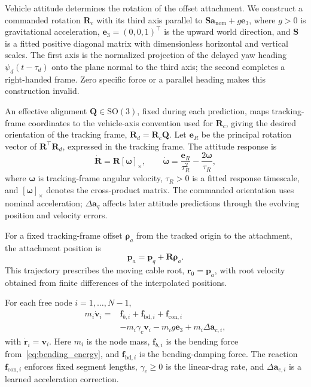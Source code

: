 Vehicle attitude determines the rotation of the offset attachment.
We construct a commanded rotation $\mathbf R_c$ with its third
axis parallel to
$\mathbf S\mathbf a_{\mathrm{nom}}+g\mathbf e_3$,
where $g>0$ is gravitational acceleration,
$\mathbf e_3=(0,0,1)^\top$ is the upward world direction,
and $\mathbf S$ is a fitted positive diagonal matrix with
dimensionless horizontal and vertical scales.
The first axis is the normalized projection of the delayed yaw
heading $\psi_d(t-\tau_d)$ onto the plane normal to the third
axis; the second completes a right-handed frame. Zero specific
force or a parallel heading makes this construction invalid.

An effective alignment $\mathbf Q\in\mathrm{SO}(3)$, fixed
during each prediction, maps tracking-frame coordinates to the
vehicle-axis convention used for $\mathbf R_c$, giving the
desired orientation of the tracking frame,
$\mathbf R_d=\mathbf R_c\mathbf Q$.
Let $\mathbf e_R$ be the principal rotation vector of
$\mathbf R^\top\mathbf R_d$, expressed in the tracking frame.
The attitude response is
\begin{equation}
\dot{\mathbf R}=\mathbf R[\boldsymbol\omega]_\times,
\qquad
\dot{\boldsymbol\omega}=\frac{\mathbf e_R}{\tau_R^2}
-\frac{2\boldsymbol\omega}{\tau_R},
\label{eq:attitude_response}
\end{equation}
where $\boldsymbol\omega$ is tracking-frame angular velocity,
$\tau_R>0$ is a fitted response timescale, and
$[\boldsymbol\omega]_\times$ denotes the cross-product matrix.
The commanded orientation uses nominal acceleration;
$\Delta\mathbf a_q$ affects later attitude predictions
through the evolving position and velocity errors.

For a fixed tracking-frame offset $\boldsymbol\rho_a$
from the tracked origin to the attachment, the attachment
position is
\begin{equation}
\mathbf p_a=\mathbf p_q+\mathbf R\boldsymbol\rho_a.
\label{eq:attachment_mapping}
\end{equation}
This trajectory prescribes the moving cable root,
$\mathbf r_0=\mathbf p_a$, with root velocity obtained from
finite differences of the interpolated positions.

For each free node $i=1,\ldots,N-1$,
\begin{equation}
\begin{aligned}
m_i\dot{\mathbf v}_i
={}&\mathbf f_{b,i}
   +\mathbf f_{\mathrm{bd},i}
   +\mathbf f_{\mathrm{con},i}\\
&-m_i\gamma_c\mathbf v_i
 -m_i g\mathbf e_3
 +m_i\Delta\mathbf a_{c,i},
\end{aligned}
\label{eq:driven_cable_dynamics}
\end{equation}
with $\dot{\mathbf r}_i=\mathbf v_i$.
Here $m_i$ is the node mass, $\mathbf f_{b,i}$ is the bending
force from~\eqref{eq:bending_energy}, and
$\mathbf f_{\mathrm{bd},i}$ is the bending-damping force.
The reaction $\mathbf f_{\mathrm{con},i}$ enforces fixed
segment lengths, $\gamma_c\geq0$ is the linear-drag rate,
and $\Delta\mathbf a_{c,i}$ is a learned acceleration correction.

